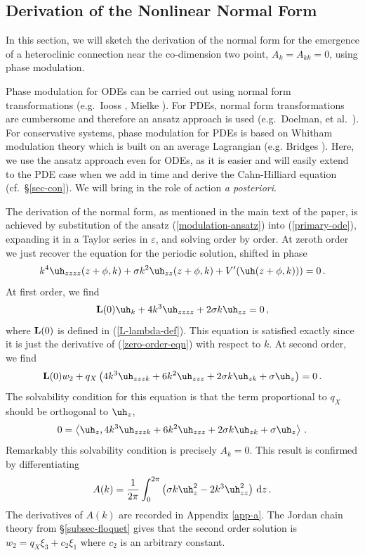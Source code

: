 \documentclass[10pt]{article}
\renewcommand{\theequation}{\arabic{section}.\arabic{equation}}
\def\rd{{\rm d}} \def\re{{\rm e}} \def\fr{\mbox{$\frac{1}{2}$}}
\def\eps{{\varepsilon}} \def\reps{\textcolor{red}{{\varepsilon}}}
\renewcommand{\theequation}{\arabic{section}.\arabic{equation}}
\begin{document}
\begin{appendix}
 \renewcommand{\theequation}{B-\arabic{equation}}

 \section{Derivation of the Nonlinear Normal Form}
 \label{mod-reduction}
 In this section, we will sketch the derivation of the normal form for the emergence of a
 heteroclinic connection near the co-dimension two point, $A_k=A_{kk}=0$, using
 phase modulation.

Phase modulation for ODEs can be carried out using normal form transformations
(e.g.\ Iooss \cite{iooss1988global}, Mielke \cite{mielke1996spatial}).  For
PDEs, normal form transformations are cumbersome and therefore an ansatz
approach is used (e.g.\ Doelman, et al.~\cite{doelman2009dynamics}).  For
conservative systems, phase modulation for PDEs is based on Whitham modulation
theory which is built on an average Lagrangian (e.g. Bridges
\cite{bridges2017symmetry}).  Here, we use the ansatz approach even for ODEs, as
it is easier and will easily extend to the PDE case when we add in time
and derive the Cahn-Hilliard equation (cf.\ \S\ref{sec-con}). We will bring in the role of action {\it
a posteriori}.

The derivation of the normal form, as mentioned in the main text of the paper,
is achieved by substitution of the ansatz (\ref{modulation-ansatz}) into
(\ref{primary-ode}), expanding it in a Taylor series in $\eps$, and solving
order by order.  At zeroth order we just recover the equation for the periodic
solution, shifted in phase
%
\begin{equation}\label{zero-order-eqn}
k^4\uh_{zzzz}(z+\phi,k) + \sigma k^2\uh_{zz}(z+\phi,k) + V'(\uh(z+\phi,k)))=0\,.
\end{equation}
%
At first order, we find
\[
{\bf L}(0)\uh_k + 4k^3\uh_{zzzz} + 2\sigma k\uh_{zz} =0\,,
\]
where ${\bf L}(0)$ is defined in (\ref{L-lambda-def}). This equation is
satisfied exactly since it is just the derivative of (\ref{zero-order-eqn}) with
respect to $k$. At second order, we find
\[
{\bf L}(0)w_2 + q_X\left(4k^3\uh_{zzzk} + 6k^2\uh_{zzz} + 2\sigma k\uh_{zk} + \sigma \uh_z\right) = 0 \,.
\]
The solvability condition for this equation is that the term proportional to
$q_X$ should be orthogonal to $\uh_z$,
\[
0 = \left\langle \uh_z,4k^3\uh_{zzzk} + 6k^2\uh_{zzz} + 2\sigma k\uh_{zk} + \sigma \uh_z\right\rangle\,.
\]
Remarkably this solvability condition is precisely $A_k=0$. This result is
confirmed by differentiating
\[
A(k) = \frac{1}{2\pi}\int_0^{2\pi}\left(\sigma k \uh_z^2 - 2k^3\uh_{zz}^2\right)\,\rd z\,.
\]
The derivatives of $A(k)$ are recorded in Appendix \ref{app-a}.  The Jordan chain
theory from \S\ref{subsec-floquet} gives that the second order solution is
$w_2=q_X\xi_3 + c_2\xi_1$ where $c_2$ is an arbitrary constant.


\end{appendix}
\end{document}
